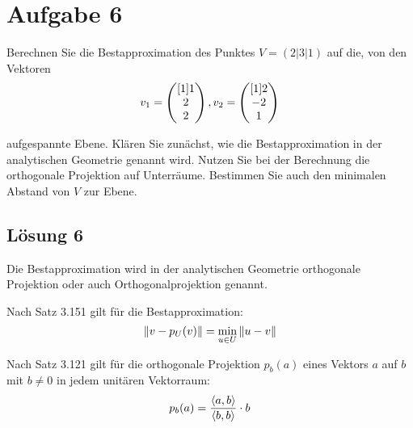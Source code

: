 \documentclass[main.tex]{subfiles}
\begin{document}
\section{Aufgabe 6}
Berechnen Sie die Bestapproximation des Punktes $V=( 2|3|1)$ auf die, von den Vektoren
\begin{equation*}
    v_{1} = \begin{pmatrix}[1] 1 \\ 2 \\ 2 \end{pmatrix}, v_{2} = \begin{pmatrix}[1] 2 \\ -2 \\ 1 \end{pmatrix}
\end{equation*}

aufgespannte Ebene. Klären Sie zunächst, wie die Bestapproximation in der analytischen Geometrie genannt wird. Nutzen Sie bei der Berechnung die orthogonale Projektion auf Unterräume. Bestimmen Sie auch den minimalen Abstand von $V$ zur Ebene.

\subsection{Lösung 6}
Die Bestapproximation wird in der analytischen Geometrie orthogonale Projektion oder auch Orthogonalprojektion genannt.

Nach Satz 3.151 gilt für die Bestapproximation:
\begin{equation*}
	\left\| v-p_{U}(v) \right\| = \underset{u\in U}{\min} \left\| u-v \right\|
\end{equation*}

Nach Satz 3.121 gilt für die orthogonale Projektion $p_{b}(a)$ eines Vektors $a$ auf $b$ mit $b\neq 0$ in jedem unitären Vektorraum:
\begin{equation*}
	p_{b}( a) =\frac{\left\langle a,b \right\rangle}{\left\langle b,b \right\rangle} \cdot b
\end{equation*}
\end{document}
